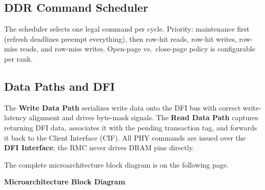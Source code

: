 \documentclass[10pt]{article}
\begin{document}
\subsection{DDR Command Scheduler}
The scheduler selects one legal command per cycle. Priority: maintenance first (refresh
deadlines preempt everything), then row-hit reads, row-hit writes, row-miss reads, and
row-miss writes. Open-page vs.\ close-page policy is configurable per rank.

\subsection{Data Paths and DFI}
The \textbf{Write Data Path} serializes write data onto the DFI bus with correct
write-latency alignment and drives byte-mask signals. The \textbf{Read Data Path}
captures returning DFI data, associates it with the pending transaction tag, and
forwards it back to the Client Interface (CIF). All PHY commands are issued over the
\textbf{DFI Interface}; the RMC never drives DRAM pins directly.

\noindent The complete microarchitecture block diagram is on the following page.

\newpage
\thispagestyle{fancy}

\begin{center}
{\large\bfseries\color{NavyD} Microarchitecture Block Diagram}\\[6pt]
\end{center}

\end{document}

